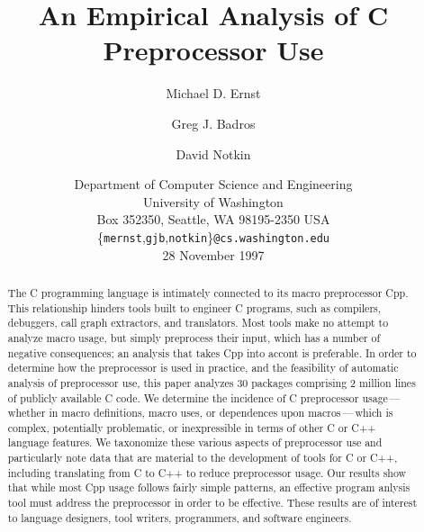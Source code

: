 \documentclass[10pt]{article}
\def\numpackages{30}
\def\numlines{2 million}
\begin{document}
% 


\title{An Empirical Analysis of C Preprocessor Use}

\author{Michael D. Ernst \and Greg J. Badros \and David Notkin}

\date{%
Department of Computer Science and Engineering \\
University of Washington \\
Box 352350, Seattle, WA  98195-2350  USA \\
{\small \{{\tt mernst},{\tt gjb},{\tt notkin}\}{\tt @cs.washington.edu}} \\
28 November 1997}  

\maketitle

\begin{abstract}
  The C programming language is intimately connected to its macro
  preprocessor Cpp.  This relationship hinders tools built to engineer C
  programs, such as compilers, debuggers, call graph extractors, and
  translators.  Most tools make no attempt to analyze macro usage, but
  simply preprocess their input, which has a number of negative
  consequences; an analysis that takes Cpp into accont is preferable.  In
  order to determine how the preprocessor is used in practice, and the
  feasibility of automatic analysis of preprocessor use, this paper
  analyzes {\numpackages} packages comprising {\numlines} lines of publicly
  available C code.  We determine the incidence of C preprocessor
  usage\,---\,whether in macro definitions, macro uses, or dependences upon
  macros\,---\,which is complex, potentially problematic, or inexpressible
  in terms of other C or C++ language features.  We taxonomize these
  various aspects of preprocessor use and particularly note data that are
  material to the development of tools for C or C++, including translating
  from C to C++ to reduce preprocessor usage.  Our results show that while
  most Cpp usage follows fairly simple patterns, an effective program
  anlysis tool must address the preprocessor in order to be effective.
  These results are of interest to language designers, tool writers,
  programmers, and software engineers.
\end{abstract}

\bigskip
\end{document}

